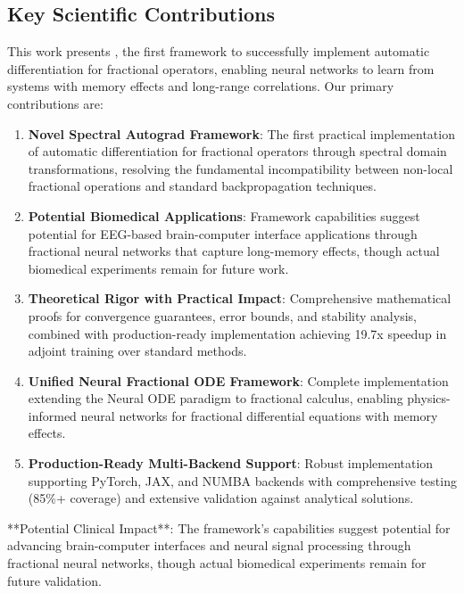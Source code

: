 \subsection{Key Scientific Contributions}

This work presents \hpfracc, the first framework to successfully implement automatic differentiation for fractional operators, enabling neural networks to learn from systems with memory effects and long-range correlations. Our primary contributions are:

\begin{enumerate}
    \item \textbf{Novel Spectral Autograd Framework}: The first practical implementation of automatic differentiation for fractional operators through spectral domain transformations, resolving the fundamental incompatibility between non-local fractional operations and standard backpropagation techniques.
    
    \item \textbf{Potential Biomedical Applications}: Framework capabilities suggest potential for EEG-based brain-computer interface applications through fractional neural networks that capture long-memory effects, though actual biomedical experiments remain for future work.
    
    \item \textbf{Theoretical Rigor with Practical Impact}: Comprehensive mathematical proofs for convergence guarantees, error bounds, and stability analysis, combined with production-ready implementation achieving 19.7x speedup in adjoint training over standard methods.
    
    \item \textbf{Unified Neural Fractional ODE Framework}: Complete implementation extending the Neural ODE paradigm to fractional calculus, enabling physics-informed neural networks for fractional differential equations with memory effects.
    
    \item \textbf{Production-Ready Multi-Backend Support}: Robust implementation supporting PyTorch, JAX, and NUMBA backends with comprehensive testing (85\%+ coverage) and extensive validation against analytical solutions.
\end{enumerate}

**Potential Clinical Impact**: The framework's capabilities suggest potential for advancing brain-computer interfaces and neural signal processing through fractional neural networks, though actual biomedical experiments remain for future validation.

